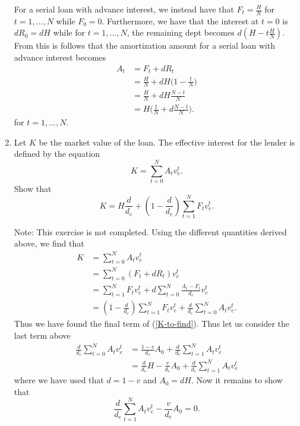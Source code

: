 \documentclass[a4paper,colorinlistoftodos, 10pt]{article}
\begin{document}
\begin{enumerate}
For a serial loan with advance interest, we instead have that $F_t = \frac{H}{N}$ for $t=1,\dots, N$ while $F_0=0$. Furthermore, we have that the interest at $t=0$ is $dR_0=dH$ while for $t=1,\dots,N$, the remaining dept becomes $d(H-t\frac{H}{N})$. From this is follows that the amortization amount for a serial loan with advance interest becomes
\begin{align*}
A_t & = F_t + dR_t \\
& = \frac{H}{N} + dH\Big(1-\frac{t}{N}\Big) \\
& = \frac{H}{N} + dH\frac{N-t}{N} \\
& = H\Big(\frac{1}{N} + d\frac{N-t}{N}\Big).
\end{align*}
for $t=1,\dots,N$.

\item Let $K$ be the market value of the loan. The effective interest for the lender is defined by the equation 
\begin{equation}
    K = \sum_{t = 0}^N A_tv_e^t.
\end{equation}
Show that 
\begin{equation}\label{K-to-find}
    K = H\frac{d}{d_e} + (1-\frac{d}{d_e})\sum_{t=1}^N F_t v_e^t.
\end{equation}

Note: This exercise is not completed. Using the different quantities derived above, we find that 
\begin{align*}
K & = \sum_{t = 0}^N A_tv_e^t \\
& = \sum_{t = 0}^N (F_t + dR_t)v_e^t \\
& = \sum_{t = 1}^N F_tv_e^t + d \sum_{t = 0}^N \frac{A_t - F_t}{d_e}v_e^t \\
& = (1-\frac{d}{d_e}) \sum_{t = 1}^N F_tv_e^t + \frac{d}{d_e}\sum_{t=0}^N A_tv_e^t.
\end{align*}
Thus we have found the final term of (\ref{K-to-find}). Thus let us consider the last term above
\begin{align*}
\frac{d}{d_e}\sum_{t=0}^N A_tv_e^t & = \frac{1-v}{d_e}A_0 + \frac{d}{d_e}\sum_{t=1}^N A_tv_e^t \\
& = \frac{d}{d_e}H - \frac{v}{d_e} A_0 + \frac{d}{d_e}\sum_{t=1}^N A_tv_e^t
\end{align*}
where we have used that $d=1-v$ and $A_0=dH$. Now it remains to show that 
\begin{equation*}
\frac{d}{d_e}\sum_{t=1}^N A_tv_e^t - \frac{v}{d_e} A_0 = 0.
\end{equation*}
\end{enumerate}
\end{document}
